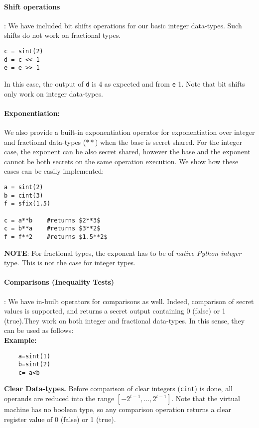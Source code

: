 \paragraph{Shift operations}:
We have included bit shifts operations for our basic integer data-types. Such shifts do not work on fractional types. 
\begin{lstlisting}
c = sint(2)
d = c << 1
e = e >> 1 
\end{lstlisting}
In this case, the output of \verb|d| is 4 as expected and from \verb|e| 1. Note that bit shifts only work on integer data-types.
\\
\paragraph{Exponentiation:}
We also provide a built-in exponentiation operator for exponentiation over integer and fractional data-types ($**$) when the base is secret shared. For the integer case, the exponent can be also secret shared, however the base and the exponent cannot be both secrets on the same operation execution. We show how these cases can be easily implemented: 
\begin{lstlisting}
a = sint(2)
b = cint(3)
f = sfix(1.5)

c = a**b 	#returns $2**3$
c = b**a 	#returns $3**2$
f = f**2	#returns $1.5**2$
\end{lstlisting}
\textbf{NOTE}: For fractional types, the exponent has to be of \textit{native Python integer} type. This is not the case for integer types.
\\
\paragraph{Comparisons (Inequality Tests)}:
We have in-built operators for comparisons as well. Indeed, comparison of secret values is supported, and returns a secret output containing 0 (false) or 1 (true).They work on both integer and fractional data-types. In this sense, they can be used as follows: \\
\textbf{Example:}
\begin{lstlisting}
	a=sint(1)
	b=sint(2)
	c= a<b
\end{lstlisting}

\noindent
\textbf{Clear Data-types.} Before comparison of clear integers (\verb|cint|) is done,
all operands are reduced into the range $[-2^{t-1}, \dots, 2^{t-1}]$.
Note that the virtual machine has no boolean type,
so any comparison operation returns a clear register value of 0
(false) or 1 (true).


